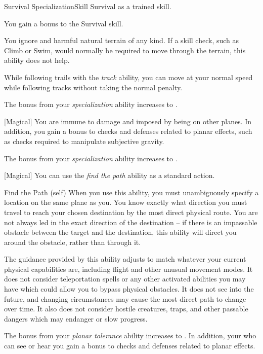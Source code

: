     \begin{feat}{Survival Specialization}{Skill}
        \featpre Survival as a trained skill.

         You gain a  bonus to the Survival skill.

         You ignore  and harmful natural terrain of any kind.
        If a skill check, such as Climb or Swim, would normally be required to move through the terrain, this ability does not help.

        While following trails with the \textit{track} ability, you can move at your normal speed while following tracks without taking the normal  penalty.

         The bonus from your \textit{specialization} ability increases to .

        [Magical] You are immune to damage and  imposed by being on other planes.
        In addition, you gain a  bonus to checks and defenses related to planar effects, such as checks required to manipulate subjective gravity.

         The bonus from your \textit{specialization} ability increases to .

        [Magical] You can use the \textit{find the path} ability as a standard action.
        \begin{attuneability}{Find the Path}
             (self)
            \rankline
            When you use this ability, you must unambiguously specify a location on the same plane as you.
            You know exactly what direction you must travel to reach your chosen destination by the most direct physical route.
            You are not always led in the exact direction of the destination -- if there is an impassable obstacle between the target and the destination, this ability will direct you around the obstacle, rather than through it.

            The guidance provided by this ability adjusts to match whatever your current physical capabilities are, including flight and other unusual movement modes.
            It does not consider teleportation spells or any other activated abilities you may have which could allow you to bypass physical obstacles.
            It does not see into the future, and changing circumstances may cause the most direct path to change over time.
            It also does not consider hostile creatures, traps, and other passable dangers which may endanger or slow progress.
        \end{attuneability}

         The bonus from your \textit{planar tolerance} ability increases to .
        In addition, your  who can see or hear you gain a  bonus to checks and defenses related to planar effects.
    \end{feat}

